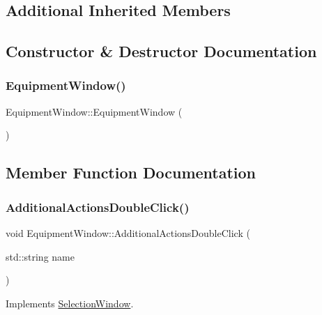 \subsection*{Additional Inherited Members}


\subsection{Constructor \& Destructor Documentation}
\mbox{\label{class_equipment_window_ae2fd493944d97be1e7ac583f3ce3972c}} 
\subsubsection{\texorpdfstring{Equipment\+Window()}{EquipmentWindow()}}
{\footnotesize\ttfamily Equipment\+Window\+::\+Equipment\+Window (\begin{DoxyParamCaption}{ }\end{DoxyParamCaption})}



\subsection{Member Function Documentation}
\mbox{\label{class_equipment_window_abfd5a25ea90203e21291d6c6725b30f2}} 
\subsubsection{\texorpdfstring{Additional\+Actions\+Double\+Click()}{AdditionalActionsDoubleClick()}}
{\footnotesize\ttfamily void Equipment\+Window\+::\+Additional\+Actions\+Double\+Click (\begin{DoxyParamCaption}\item[{std\+::string}]{name }\end{DoxyParamCaption})\hspace{0.3cm}{\ttfamily [virtual]}}



Implements \mbox{\hyperlink{class_selection_window_a853f6c1c78163cd976d8a7d7bf1a9153}{Selection\+Window}}.

